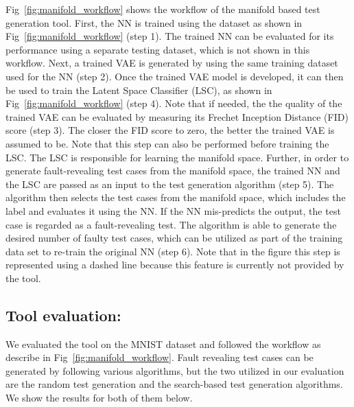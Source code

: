 Fig~\ref{fig:manifold_workflow} shows the workflow of the manifold based test generation tool. First, the NN is trained using the dataset as shown in Fig~\ref{fig:manifold_workflow} (step 1). The trained NN can be evaluated for its performance using a separate testing dataset, which is not shown in this workflow. Next, a trained VAE is generated by using the same training dataset used for the NN (step 2). Once the trained VAE model is developed, it can then be used to train the Latent Space Classifier (LSC), as shown in Fig~\ref{fig:manifold_workflow} (step 4). Note that if needed, the the quality of the trained VAE can be evaluated by measuring its Frechet Inception Distance (FID) score (step 3). The closer the FID score to zero, the better the trained VAE is assumed to be. Note that this step can also be performed before training the LSC. The LSC is responsible for learning the manifold space. Further, in order to generate fault-revealing test cases from the manifold space, the trained NN and the LSC are passed as an input to the test generation algorithm (step 5). The algorithm then selects the test cases from the manifold space, which includes the label and evaluates it using the NN. If the NN mis-predicts the output, the test case is regarded as a fault-revealing test. The algorithm is able to generate the desired number of faulty test cases, which can be utilized as part of the training data set to re-train the original NN (step 6). Note that in the figure this step is represented using a dashed line because this feature is currently not provided by the tool.

\subsection{Tool evaluation:} We evaluated the tool on the MNIST dataset and followed the workflow as describe in Fig~\ref{fig:manifold_workflow}. Fault revealing test cases can be generated by following various algorithms, but the two utilized in our evaluation are the random test generation and the search-based test generation algorithms. We show the results for both of them below. 

